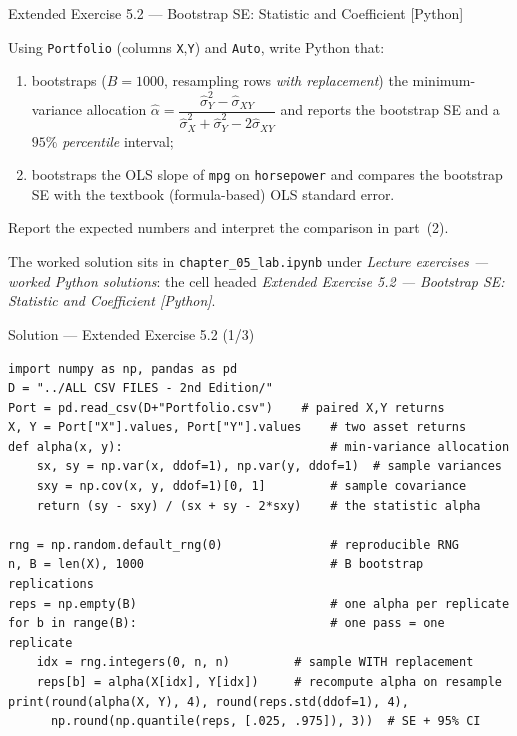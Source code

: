 \documentclass[aspectratio=169,11pt]{beamer}
\begin{document}
\begin{frame}[fragile]{Extended Exercise 5.2 --- Bootstrap SE: Statistic and Coefficient [Python]}
  \begin{longexercise}
    Using \texttt{Portfolio} (columns \texttt{X},\texttt{Y}) and
    \texttt{Auto}, write Python that:
    \begin{enumerate}
      \item bootstraps ($B=1000$, resampling rows \emph{with
            replacement}) the minimum-variance allocation
            $\hat\alpha=\dfrac{\hat\sigma_Y^2-\hat\sigma_{XY}}
            {\hat\sigma_X^2+\hat\sigma_Y^2-2\hat\sigma_{XY}}$
            and reports the bootstrap SE and a $95\%$ \emph{percentile}
            interval;
      \item bootstraps the OLS slope of \texttt{mpg} on
            \texttt{horsepower} and compares the bootstrap SE with the
            textbook (formula-based) OLS standard error.
    \end{enumerate}
    Report the expected numbers and interpret the comparison in part~(2).
  \end{longexercise}
  \begin{labnote}
    The worked solution sits in \texttt{chapter\_05\_lab.ipynb} under
    \emph{Lecture exercises --- worked Python solutions}: the cell headed
    \emph{Extended Exercise 5.2 --- Bootstrap SE: Statistic and Coefficient [Python]}.
  \end{labnote}
\end{frame}

\begin{frame}[fragile]{Solution --- Extended Exercise 5.2 (1/3)}
  \begin{lstlisting}
import numpy as np, pandas as pd
D = "../ALL CSV FILES - 2nd Edition/"
Port = pd.read_csv(D+"Portfolio.csv")    # paired X,Y returns
X, Y = Port["X"].values, Port["Y"].values    # two asset returns
def alpha(x, y):                             # min-variance allocation
    sx, sy = np.var(x, ddof=1), np.var(y, ddof=1)  # sample variances
    sxy = np.cov(x, y, ddof=1)[0, 1]         # sample covariance
    return (sy - sxy) / (sx + sy - 2*sxy)    # the statistic alpha

rng = np.random.default_rng(0)               # reproducible RNG
n, B = len(X), 1000                          # B bootstrap replications
reps = np.empty(B)                           # one alpha per replicate
for b in range(B):                           # one pass = one replicate
    idx = rng.integers(0, n, n)         # sample WITH replacement
    reps[b] = alpha(X[idx], Y[idx])     # recompute alpha on resample
print(round(alpha(X, Y), 4), round(reps.std(ddof=1), 4),
      np.round(np.quantile(reps, [.025, .975]), 3))  # SE + 95% CI
  \end{lstlisting}
\end{frame}
\end{document}
